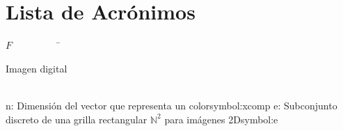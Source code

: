 \newpage
\chapter*{Lista de Acrónimos\hfill}
\begin{tabbing}
$F$~~~~~~~~~~\=\parbox{5in}{Imagen digital\dotfill \pageref{symbol:F}}\\

\newsymbol n: {Dimensión del vector que representa un color}{symbol:xcomp}
\newsymbol e: {Subconjunto discreto de una grilla rectangular $\mathbb{N}^{2}$ para imágenes 2D}{symbol:e}


\end{tabbing}